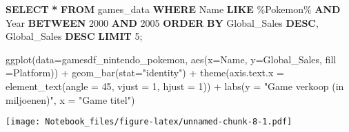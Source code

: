 \documentclass[
]{article}
\newenvironment{Shaded}{\begin{snugshade}}{\end{snugshade}}
\newcommand{\AttributeTok}[1]{\textcolor[rgb]{0.77,0.63,0.00}{#1}}
\newcommand{\DecValTok}[1]{\textcolor[rgb]{0.00,0.00,0.81}{#1}}
\newcommand{\FunctionTok}[1]{\textcolor[rgb]{0.00,0.00,0.00}{#1}}
\newcommand{\KeywordTok}[1]{\textcolor[rgb]{0.13,0.29,0.53}{\textbf{#1}}}
\newcommand{\NormalTok}[1]{#1}
\newcommand{\OperatorTok}[1]{\textcolor[rgb]{0.81,0.36,0.00}{\textbf{#1}}}
\newcommand{\SpecialCharTok}[1]{\textcolor[rgb]{0.00,0.00,0.00}{#1}}
\newcommand{\StringTok}[1]{\textcolor[rgb]{0.31,0.60,0.02}{#1}}
\begin{document}
\begin{Shaded}
\begin{Highlighting}[]
\KeywordTok{SELECT} \OperatorTok{*} \KeywordTok{FROM}\NormalTok{ \textasciigrave{}games\_data\textasciigrave{} }
  \KeywordTok{WHERE}\NormalTok{ Name }\KeywordTok{LIKE} \StringTok{\textquotesingle{}\%Pokemon\%\textquotesingle{}} 
    \KeywordTok{AND}\NormalTok{ \textasciigrave{}Year\textasciigrave{} }\KeywordTok{BETWEEN} \DecValTok{2000} \KeywordTok{AND} \DecValTok{2005}
      \KeywordTok{ORDER} \KeywordTok{BY}\NormalTok{ Global\_Sales }\KeywordTok{DESC}\NormalTok{, Global\_Sales }\KeywordTok{DESC}
        \KeywordTok{LIMIT} \DecValTok{5}\NormalTok{; }
      
\end{Highlighting}
\end{Shaded}

\begin{Shaded}
\begin{Highlighting}[]
\FunctionTok{ggplot}\NormalTok{(}\AttributeTok{data=}\NormalTok{gamesdf\_nintendo\_pokemon,}
  \FunctionTok{aes}\NormalTok{(}\AttributeTok{x=}\NormalTok{Name, }\AttributeTok{y=}\NormalTok{Global\_Sales, }\AttributeTok{fill =}\NormalTok{Platform)) }\SpecialCharTok{+}
    \FunctionTok{geom\_bar}\NormalTok{(}\AttributeTok{stat=}\StringTok{"identity"}\NormalTok{) }\SpecialCharTok{+}
    \FunctionTok{theme}\NormalTok{(}\AttributeTok{axis.text.x =} \FunctionTok{element\_text}\NormalTok{(}\AttributeTok{angle =} \DecValTok{45}\NormalTok{, }\AttributeTok{vjust =} \DecValTok{1}\NormalTok{, }\AttributeTok{hjust =} \DecValTok{1}\NormalTok{)) }\SpecialCharTok{+}
       \FunctionTok{labs}\NormalTok{(}\AttributeTok{y =} \StringTok{"Game verkoop (in miljoenen)"}\NormalTok{, }\AttributeTok{x =} \StringTok{"Game titel"}\NormalTok{)}
\end{Highlighting}
\end{Shaded}

\texttt{[image: Notebook\_files/figure-latex/unnamed-chunk-8-1.pdf]}
\end{document}
